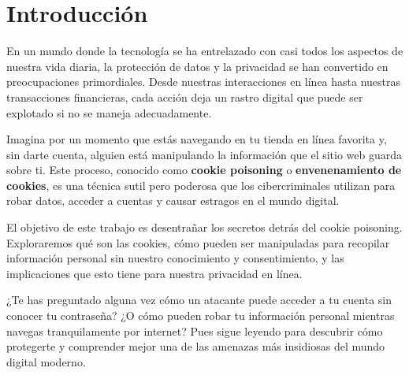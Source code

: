 \section{Introducción}

En un mundo donde la tecnología se ha entrelazado con casi todos los aspectos de nuestra vida diaria, la protección de datos y la privacidad se han convertido en preocupaciones primordiales. Desde nuestras interacciones en línea hasta nuestras transacciones financieras, cada acción deja un rastro digital que puede ser explotado si no se maneja adecuadamente.

Imagina por un momento que estás navegando en tu tienda en línea favorita y, sin darte cuenta, alguien está manipulando la información que el sitio web guarda sobre ti. Este proceso, conocido como \textbf{cookie poisoning} o \textbf{envenenamiento de cookies}, es una técnica sutil pero poderosa que los cibercriminales utilizan para robar datos, acceder a cuentas y causar estragos en el mundo digital.

El objetivo de este trabajo es desentrañar los secretos detrás del cookie poisoning. Exploraremos qué son las cookies, cómo pueden ser manipuladas para recopilar información personal sin nuestro conocimiento y consentimiento, y las implicaciones que esto tiene para nuestra privacidad en línea.

¿Te has preguntado alguna vez cómo un atacante puede acceder a tu cuenta sin conocer tu contraseña? ¿O cómo pueden robar tu información personal mientras navegas tranquilamente por internet? Pues sigue leyendo para descubrir cómo protegerte y comprender mejor una de las amenazas más insidiosas del mundo digital moderno.


